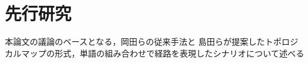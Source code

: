 \chapter{先行研究}
\label{chap:prior}
本論文の議論のベースとなる，岡田らの従来手法と
島田らが提案したトポロジカルマップの形式，単語の組み合わせで経路を表現したシナリオについて述べる